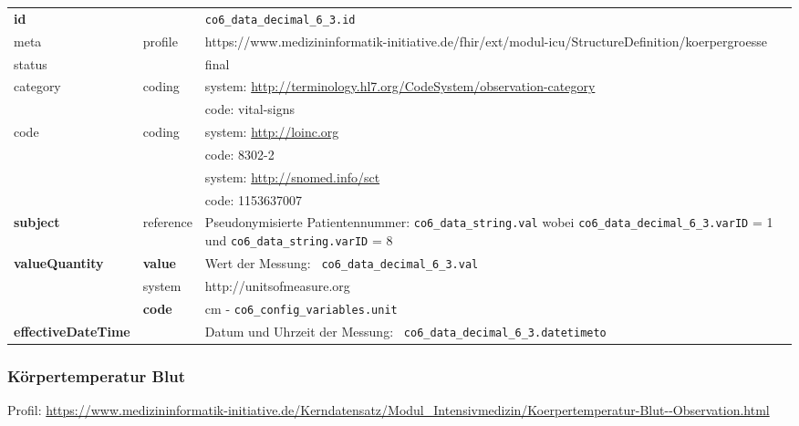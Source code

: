 \begin{longtable}{|l|l|p{7.5cm}|}
        \hline
        \rowcolor{lightgray} \multicolumn{3}{|l|}{Data Mapping (inhaltlich)} \\ \hline
        \textbf{id} &  & \texttt{co6\_data\_decimal\_6\_3.id} \\ \hline
	meta & profile & https://www.medizininformatik-initiative.de/fhir/ext/modul-icu/StructureDefinition/koerpergroesse \\ \hline 
	status &  & final   \\ \hline 
	category & coding & system: \url{http://terminology.hl7.org/CodeSystem/observation-category} \\
\cline{3-3}
	& & code: vital-signs \\ \hline
	code & coding & system: \url{http://loinc.org} \\ 
	\cline{3-3} 
	&  & code: 8302-2 \\ 
	\cline{3-3} 
	&  & system: \url{http://snomed.info/sct} \\ 
	\cline{3-3}
	&  & code: 1153637007 \\ \hline
	\textbf{subject} & reference & Pseudonymisierte Patientennummer: \texttt{co6\_data\_string.val} wobei \texttt{co6\_data\_decimal\_6\_3.varID} = 1 und \texttt{co6\_data\_string.varID} = 8 \\ \hline
	 \textbf{valueQuantity}  & \textbf{value} & Wert der Messung: \texttt{
co6\_data\_decimal\_6\_3.val} \\
        \cline{2-3}
         & system & http://unitsofmeasure.org \\
         \cline{2-3}
         & \textbf{code} & cm - \texttt{co6\_config\_variables.unit} \\ \hline
     \textbf{effectiveDateTime}  & & Datum und Uhrzeit der Messung: \texttt{
co6\_data\_decimal\_6\_3.datetimeto} \\ \hline
\end{longtable}


\subsubsection{Körpertemperatur Blut} 
Profil: \url{https://www.medizininformatik-initiative.de/Kerndatensatz/Modul_Intensivmedizin/Koerpertemperatur-Blut--Observation.html}

